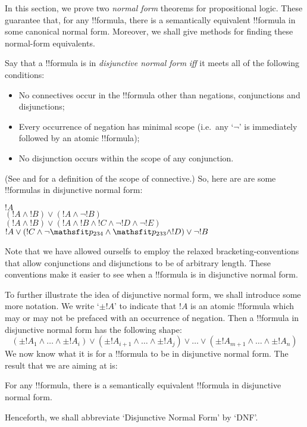 \documentclass[../../../include/open-logic-section]{subfiles}
\begin{document}


In this section, we prove two \emph{normal form} theorems for propositional logic. These guarantee that, for any !!{formula}, there is a semantically equivalent !!{formula} in some canonical normal form. Moreover, we shall give methods for finding these normal-form equivalents.

Say that a !!{formula} is in \emph{disjunctive normal form} \emph{iff} it meets all of the following conditions:
	\begin{itemize}
		\item No connectives occur in the !!{formula} other than negations, conjunctions and disjunctions;
		\item Every occurrence of negation has minimal scope (i.e.\ any `$\lnot$' is immediately followed by an atomic !!{formula});
		\item No disjunction occurs within the scope of any conjunction.
	\end{itemize}
(See  and  for a definition of the scope of connective.) So, here are are some !!{formula}s in disjunctive normal form:
	\begin{center}
		$!A$\\
		$(!A \land !B) \lor (!A \land \lnot !B)$\\
		$(!A \land !B) \lor (!A \land  !B \land !C \land \lnot !D \land \lnot !E)$\\
		$!A \lor (!C \land \lnot \Obj p_{234} \land \Obj p_{233} \land !D) \lor \lnot !B$
	\end{center}
Note that we have allowed ourselfs to employ the relaxed bracketing-conventions that allow conjunctions and disjunctions to be of arbitrary length. These conventions make it easier to see when a !!{formula} is in disjunctive normal form. 

To further illustrate the idea of disjunctive normal form, we shall introduce some more notation. We write `$\pm !A$' to indicate that $!A$ is an atomic !!{formula} which may or may not be prefaced with an occurrence of negation. Then a !!{formula} in disjunctive normal form has the following shape:
	$$(\pm {!A}_1 \land \ldots \land \pm {!A}_i) \lor (\pm {!A}_{i+1} \land \ldots \land \pm{!A}_j) \lor \ldots \lor (\pm{!A}_{m+1} \land \ldots \land \pm {!A}_n)$$
We now know what it is for a !!{formula} to be in disjunctive normal form. The result that we are aiming at is:
	\begin{prop}
	For any !!{formula}, there is a semantically equivalent !!{formula} in disjunctive normal form.
	\end{prop}
Henceforth, we shall abbreviate `Disjunctive Normal Form' by `DNF'. 
\end{document}
